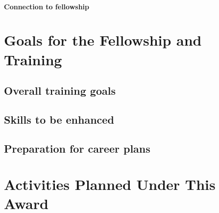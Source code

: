 \documentclass[11pt]{article}
\begin{document}
\paragraph{Connection to fellowship}
%
\section*{Goals for the Fellowship and Training}
%
\subsection{Overall training goals}
%
\subsection{Skills to be enhanced}
%
\subsection{Preparation for career plans}
%
\section*{Activities Planned Under This Award}
\end{document}
